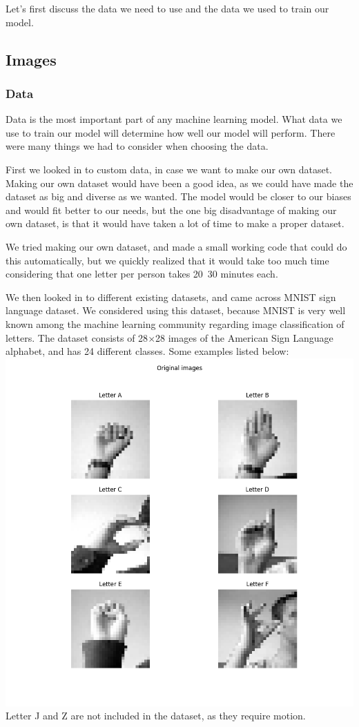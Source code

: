 \documentclass[../paper.tex]{subfiles}
\begin{document}
    Let's first discuss the data we need to use and the data we used to train our model.
    
    \subsection{Images}
    \subsubsection{Data}
    Data is the most important part of any machine learning model.
    What data we use to train our model will determine how well our model will perform. 
    There were many things we had to consider when choosing the data. 
    
    First we looked in to custom data, in case we want to make our own dataset. 
    Making our own dataset would have been a good idea, 
    as we could have made the dataset as big and diverse as we wanted.
    The model would be closer to our biases and would fit better to our needs, 
    but the one big disadvantage of making our own dataset, is that it would have taken a lot of time to make a proper dataset. 

    We tried making our own dataset, and made a small working code that could do this automatically, 
    but we quickly realized that it would take too much time considering that one letter per person takes 20~30 minutes each. 

    We then looked in to different existing datasets, and came across MNIST sign language dataset\cite{d0}. 
    We considered using this dataset, because MNIST is very well known among the machine learning community regarding image classification of letters\cite{o0}.
    The dataset consists of 28$\times$28 images of the American Sign Language alphabet, 
    and has 24 different classes. 
    Some examples listed below:
    \includegraphics[width=\linewidth]{letters_grid_6} 
    Letter J and Z are not included in the dataset, as they require motion. 
\end{document}

